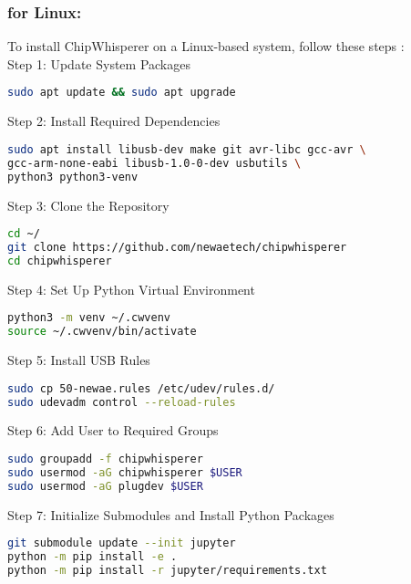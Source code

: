 \subsubsection{for Linux:}

To install ChipWhisperer on a Linux-based system, follow these steps \cite{chipwhisperer_linux_install}:\\

Step 1: Update System Packages\\
\begin{lstlisting}[language=bash]
sudo apt update && sudo apt upgrade
\end{lstlisting}

Step 2: Install Required Dependencies\\
\begin{lstlisting}[language=bash]
sudo apt install libusb-dev make git avr-libc gcc-avr \
gcc-arm-none-eabi libusb-1.0-0-dev usbutils \
python3 python3-venv
\end{lstlisting}

Step 3: Clone the Repository\\
\begin{lstlisting}[language=bash]
cd ~/
git clone https://github.com/newaetech/chipwhisperer
cd chipwhisperer
\end{lstlisting}

Step 4: Set Up Python Virtual Environment\\
\begin{lstlisting}[language=bash]
python3 -m venv ~/.cwvenv
source ~/.cwvenv/bin/activate
\end{lstlisting}

Step 5: Install USB Rules\\
\begin{lstlisting}[language=bash]
sudo cp 50-newae.rules /etc/udev/rules.d/
sudo udevadm control --reload-rules
\end{lstlisting}

Step 6: Add User to Required Groups\\
\begin{lstlisting}[language=bash]
sudo groupadd -f chipwhisperer
sudo usermod -aG chipwhisperer $USER
sudo usermod -aG plugdev $USER
\end{lstlisting}

Step 7: Initialize Submodules and Install Python Packages\\
\begin{lstlisting}[language=bash]
git submodule update --init jupyter
python -m pip install -e .
python -m pip install -r jupyter/requirements.txt
\end{lstlisting}

